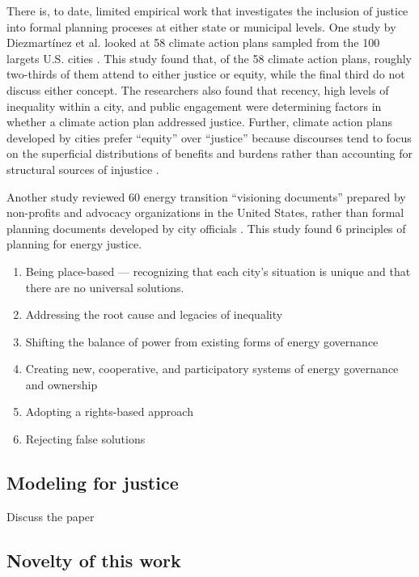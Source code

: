 There is, to date, limited empirical work that investigates the inclusion of
justice into formal planning proceses at either state or municipal levels. One
study by Diezmart\'inez et al. looked at 58 climate action plans sampled from
the 100 largets U.S. cities \cite{diezmartinez_us_2022}. This study found that,
of the 58 climate action plans, roughly two-thirds of them attend to either
justice or equity, while the final third do not discuss either concept. The
researchers also found that recency, high levels of inequality within a city,
and public engagement were determining factors in whether a climate action plan
addressed justice. Further, climate action plans developed by cities prefer
``equity'' over ``justice'' because discourses tend to focus on the superficial
distributions of benefits and burdens rather than accounting for structural
sources of injustice \cite{diezmartinez_us_2022}.

Another study reviewed 60 energy transition ``visioning documents'' prepared by
non-profits and advocacy organizations in the United States, rather than formal
planning documents developed by city officials \cite{elmallah_frontlining_2022}.
This study found 6 principles of planning for energy justice.
\begin{enumerate}
    \item Being place-based --- recognizing that each city's situation is unique
    and that there are no universal solutions.
    \item Addressing the root cause and legacies of inequality
    \item Shifting the balance of power from existing forms of energy governance
    \item Creating new, cooperative, and participatory systems of energy governance and ownership
    \item Adopting a rights-based approach
    \item Rejecting false solutions
\end{enumerate}

\subsection{Modeling for justice}

Discuss the paper \cite{lonergan_energy_2023}

\subsection{Novelty of this work}

